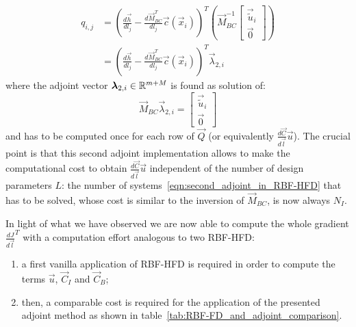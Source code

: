\begin{equation}
	\begin{aligned}
		q_{i,j} & =
		\left( \frac{d \vec{h}}{d l_j} - \frac{d \vec{M}_{BC}^T}{d l_j} \vec{c}(\vec{x}_i) \right)^T
		\left(
		\vec{M}_{BC}^{-1}
		\begin{bmatrix}
			\vec{\tilde{u}}_i  \\
			\vec{0}
		\end{bmatrix}
		\right)  \\
				& =
		\left( \frac{d \vec{h}}{d l_j} - \frac{d \vec{M}_{BC}^T}{d l_j} \vec{c}(\vec{x}_i) \right)^T
		\vec{\lambda}_{2,i}
	\end{aligned}
\end{equation}
where the adjoint vector $\boldsymbol{\lambda}_{2,i} \in \mathbb{R}^{m+M}$ is found as solution of:
\begin{equation}
	\label{eqn:second_adjoint_in_RBF-HFD}
	\vec{M}_{BC} \vec{\lambda}_{2,i} =
	\begin{bmatrix}
		\vec{\tilde{u}}_i  \\
		\vec{0}
	\end{bmatrix}
\end{equation}
and has to be computed once for each row of $\vec{Q}$ (or equivalently $\frac{d\vec{C}}{d\vec{l}} \vec{u}$). The crucial point is that this second adjoint implementation allows to make the computational cost to obtain $\frac{d\vec{C}}{d\vec{l}} \vec{u}$ independent of the number of design parameters $L$: the number of systems~\eqref{eqn:second_adjoint_in_RBF-HFD} that has to be solved, whose cost is similar to the inversion of $\vec{M}_{BC}$, is now always $N_I$.

\smallskip
In light of what we have observed we are now able to compute the whole gradient $\frac{dJ}{d\vec{l}}^T$ with a computation effort analogous to two RBF-HFD:
\begin{enumerate}
	\item a first vanilla application of RBF-HFD is required in order to compute the terms $\vec{u}$, $\vec{C}_I$ and $\vec{C}_B$;
	\item then, a comparable cost is required for the application of the presented adjoint method as shown in table~\ref{tab:RBF-FD_and_adjoint_comparison}.
\end{enumerate}

